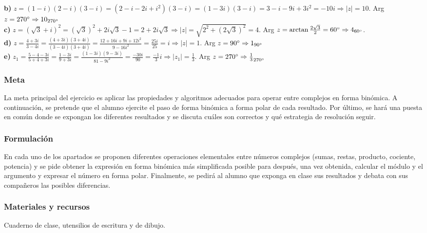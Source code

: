 \documentclass[../main.tex]{memoir}
\begin{document}
\textbf{b)} $z = (1-i)(2-i)(3-i)=(2-i-2i+i^2)(3-i)=(1-3i)(3-i)=3-i-9i+3i^2 = -10i \Rightarrow |z| = 10.$ Arg $z = 270\degree \Rightarrow 10_{270\degree}$ \\

\textbf{c)} $z = (\sqrt{3}+i)^2 = (\sqrt{3})^2 +2i \sqrt{3}-1 = 2 + 2i\sqrt{3} \Rightarrow |z| = \sqrt{2^2 + (2\sqrt{3})^2}=4.$ Arg $z = \arctan \frac{2\sqrt{3}}{2} =60\degree \Rightarrow 4_{60\degree}$. \\

\textbf{d)} $z = \frac{4+3i}{3-4i} = \frac{(4+3i)(3+4i)}{(3-4i)(3+4i)}= \frac{12+16i+9i+12i^2}{9-16i^2}= \frac{25i}{25} = i \Rightarrow |z| = 1.$ Arg $z = 90\degree \Rightarrow 1_{90\degree}$ \\

\textbf{e)} $z_1 = \frac{5-4-3i}{5+4+3i} = \frac{1-3i}{9+3i} = \frac{(1-3i)(9-3i)}{81-9i^2} = \frac{-30i}{90} = \frac{-1}{3}i \Rightarrow |z_1| = \frac{1}{3}.$ Arg $z = 270\degree \Rightarrow \frac{1}{3}_{270\degree}$




\subsubsection{Meta}
La meta principal del ejercicio es aplicar las propiedades y algoritmos adecuados para operar entre complejos en forma binómica. A continuación, se pretende que el alumno ejercite el paso de forma binómica a forma polar de cada resultado. Por último, se hará una puesta en común donde se expongan los diferentes resultados y se discuta cuáles son correctos y qué estrategia de resolución seguir.

\subsubsection{Formulación}
En cada uno de los apartados se proponen diferentes operaciones elementales entre números complejos (sumas, restas, producto, cociente, potencia) y se pide obtener la expresión en forma binómica más simplificada posible para después, una vez obtenida, calcular el módulo y el argumento y expresar el número en forma polar. Finalmente, se pedirá al alumno que exponga en clase sus resultados y debata con sus compañeros las posibles diferencias.

\subsubsection{Materiales y recursos}
Cuaderno de clase, utensilios de escritura y de dibujo.
\end{document}
